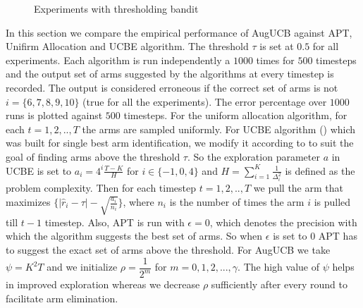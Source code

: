 \begin{figure}
\begin{tabular}{cc}
    \end{tabular}
    \caption{Experiments with thresholding bandit}
    \label{fig:budgetExpt}
\end{figure}


	In this section we compare the empirical performance of AugUCB against APT, Unifirm Allocation and UCBE algorithm. The threshold $\tau$ is set at $0.5$ for all experiments. Each algorithm is run independently a $1000$ times for $500$ timesteps and the output set of arms suggested by the algorithms at every timestep is recorded. The output is considered erroneous if the correct set of arms is not $i=\lbrace 6,7,8,9,10 \rbrace$ (true for all the experiments). The error percentage over $1000$ runs is plotted against $500$ timesteps. For the uniform allocation algorithm, for each $t=1,2,..,T$ the arms are sampled uniformly. For UCBE algorithm  (\cite{audibert2009exploration}) which was built for single best arm identification, we modify it according to \cite{locatelli2016optimal} to suit the goal of finding arms above the threshold $\tau$. So the exploration parameter $a$ in UCBE is set to $a_{i}=4^{i}\frac{T-K}{H}$ for $i\in \lbrace -1,0,4 \rbrace$ and $H=\sum_{i=1}^{K}\frac{1}{\Delta_{i}^{2}}$ is defined as the problem complexity. Then for each timestep $t=1,2,..,T$ we pull the arm that maximizes $\lbrace |\hat{r}_{i} -\tau|-\sqrt{\frac{a_{i}}{n_{i}}} \rbrace$, where $n_{i}$ is the number of times the arm $i$ is pulled till $t-1$ timestep. Also, APT is run with $\epsilon=0$, which denotes the precision with which the algorithm suggests the best set of arms. So when $\epsilon$ is  set to $0$ APT has to suggest the exact set of arms above the threshold. For AugUCB we take $\psi=K^{2}T$ and we initialize $\rho=\dfrac{1}{2^{m}}$ for $m=0,1,2,...,\gamma$. The high value of $\psi$ helps in improved exploration whereas we decrease $\rho$ sufficiently after every round to facilitate arm elimination.
	
